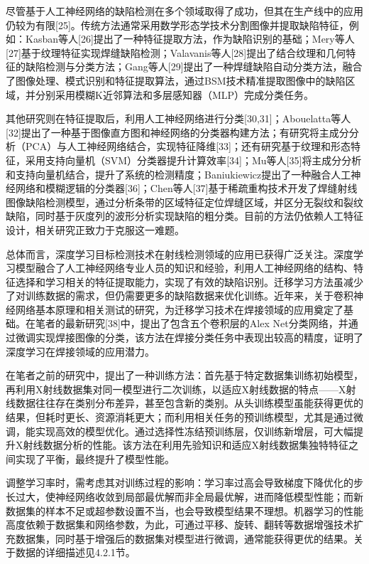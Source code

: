 尽管基于人工神经网络的缺陷检测在多个领域取得了成功，但其在生产线中的应用仍较为有限{[}25{]}。传统方法通常采用数学形态学技术分割图像并提取缺陷特征，例如：Kasban等人{[}26{]}提出了一种特征提取方法，作为缺陷识别的基础；Mery等人{[}27{]}基于纹理特征实现焊缝缺陷检测；Valavanis等人{[}28{]}提出了结合纹理和几何特征的缺陷检测与分类方法；Gang等人{[}29{]}提出了一种焊缝缺陷自动分类方法，融合了图像处理、模式识别和特征提取算法，通过BSM技术精准提取图像中的缺陷区域，并分别采用模糊K近邻算法和多层感知器（MLP）完成分类任务。

其他研究则在特征提取后，利用人工神经网络进行分类{[}30,31{]}；Abouelatta等人{[}32{]}提出了一种基于图像直方图和神经网络的分类器构建方法；有研究将主成分分析（PCA）与人工神经网络结合，实现特征降维{[}33{]}；还有研究基于纹理和形态特征，采用支持向量机（SVM）分类器提升计算效率{[}34{]}；Mu等人{[}35{]}将主成分分析和支持向量机结合，提升了系统的检测精度；Baniukiewicz提出了一种融合人工神经网络和模糊逻辑的分类器{[}36{]}；Chen等人{[}37{]}基于稀疏重构技术开发了焊缝射线图像缺陷检测模型，通过分析条带的区域特征定位焊缝区域，并区分无裂纹和裂纹缺陷，同时基于灰度列的波形分析实现缺陷的粗分类。目前的方法仍依赖人工特征设计，相关研究正致力于克服这一难题。

总体而言，深度学习目标检测技术在射线检测领域的应用已获得广泛关注。深度学习模型融合了人工神经网络专业人员的知识和经验，利用人工神经网络的结构、特征选择和学习相关的特征提取能力，实现了有效的缺陷识别。迁移学习方法虽减少了对训练数据的需求，但仍需要更多的缺陷数据来优化训练。近年来，关于卷积神经网络基本原理和相关测试的研究，为迁移学习技术在焊接领域的应用奠定了基础。在笔者的最新研究{[}38{]}中，提出了包含五个卷积层的Alex
Net分类网络，并通过微调实现焊接图像的分类，该方法在焊接分类任务中表现出较高的精度，证明了深度学习在焊接领域的应用潜力。

在笔者之前的研究中，提出了一种训练方法：首先基于特定数据集训练初始模型，再利用X射线数据集对同一模型进行二次训练，以适应X射线数据的特点------X射线数据往往存在类别分布差异，甚至包含新的类别。从头训练模型虽能获得更优的结果，但耗时更长、资源消耗更大；而利用相关任务的预训练模型，尤其是通过微调，能实现高效的模型优化。通过选择性冻结预训练层，仅训练新增层，可大幅提升X射线数据分析的性能。该方法在利用先验知识和适应X射线数据集独特特征之间实现了平衡，最终提升了模型性能。

调整学习率时，需考虑其对训练过程的影响：学习率过高会导致梯度下降优化的步长过大，使神经网络收敛到局部最优解而非全局最优解，进而降低模型性能；而新数据集的样本不足或超参数设置不当，也会导致模型结果不理想。机器学习的性能高度依赖于数据集和网络参数，为此，可通过平移、旋转、翻转等数据增强技术扩充数据集，同时基于增强后的数据集对模型进行微调，通常能获得更优的结果。关于数据的详细描述见4.2.1节。

